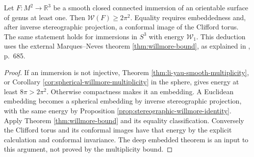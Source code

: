 \begin{corollary}\label{cor:immersed-positive-genus-willmore}
Let $F:M^2\to\mathbb R^3$ be a smooth closed connected immersion of an orientable surface of genus at least one. Then $\mathcal W(F)\geq2\pi^2$. Equality requires embeddedness and, after inverse stereographic projection, a conformal image of the Clifford torus. The same statement holds for immersions in $S^3$ with energy $\mathcal W_1$. This deduction uses the external Marques--Neves theorem \ref{thm:willmore-bound}, as explained in \cite{MNWill}, p.~685.
\end{corollary}
\begin{proof}
If an immersion is not injective, Theorem \ref{thm:li-yau-smooth-multiplicity}, or Corollary \ref{cor:spherical-willmore-multiplicity} in the sphere, gives energy at least $8\pi>2\pi^2$. Otherwise compactness makes it an embedding. A Euclidean embedding becomes a spherical embedding by inverse stereographic projection, with the same energy by Proposition \ref{prop:stereographic-willmore-identity}. Apply Theorem \ref{thm:willmore-bound} and its equality classification. Conversely the Clifford torus and its conformal images have that energy by the explicit calculation and conformal invariance. The deep embedded theorem is an input to this argument, not proved by the multiplicity bound.
\end{proof}
